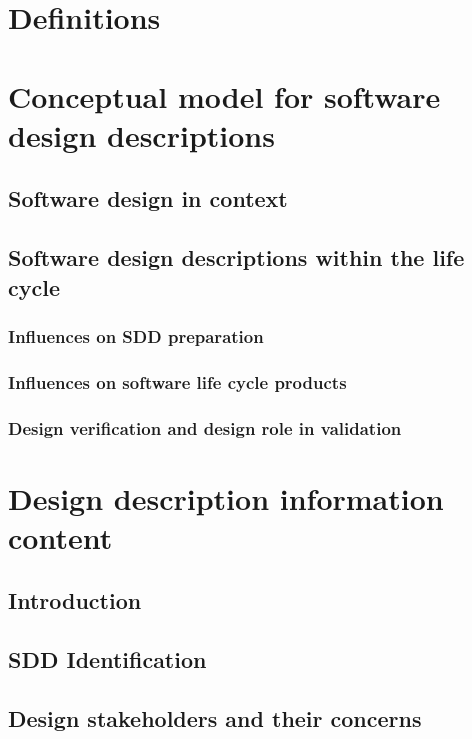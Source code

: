 \documentclass[letterpaper,10pt,draftclsnofoot,onecolumn,titlepage]{IEEEtran}
\begin{document}
	\section{Definitions}
	
	\section{Conceptual model for software design descriptions}
	
		\subsection{Software design in context}
		
		\subsection{Software design descriptions within the life cycle}
		
			\subsubsection{Influences on SDD preparation}
			
			\subsubsection{Influences on software life cycle products}
			
			\subsubsection{Design verification and design role in validation}
	
	\section{Design description information content}
	
		\subsection{Introduction}
		
		\subsection{SDD Identification}
	
		\subsection{Design stakeholders and their concerns}
		
\end{document}
